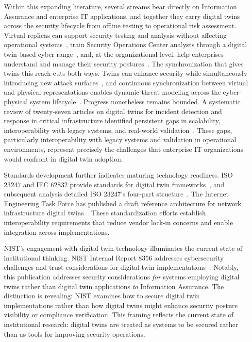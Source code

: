 Within this expanding literature, several streams bear directly on Information Assurance and enterprise IT applications, and together they carry digital twins across the security lifecycle from offline testing to operational risk assessment. Virtual replicas can support security testing and analysis without affecting operational systems~\parencite{Eckhart_Ekelhart_2019}, train Security Operations Center analysts through a digital twin-based cyber range~\parencite{Vielberth_2021}, and, at the organizational level, help enterprises understand and manage their security postures~\parencite{Dietz_Pernul_2020}. The synchronization that gives twins this reach cuts both ways. Twins can enhance security while simultaneously introducing new attack surfaces~\parencite{Karaarslan_Babiker_2021}, and continuous synchronization between virtual and physical representations enables dynamic threat modeling across the cyber-physical system lifecycle~\parencite{Erceylan_2025}. Progress nonetheless remains bounded. A systematic review of twenty-seven articles on digital twins for incident detection and response in critical infrastructure identified persistent gaps in scalability, interoperability with legacy systems, and real-world validation~\parencite{Kampourakis_2025}. These gaps, particularly interoperability with legacy systems and validation in operational environments, represent precisely the challenges that enterprise IT organizations would confront in digital twin adoption.

Standards development further indicates maturing technology readiness. ISO 23247 and IEC 62832 provide standards for digital twin frameworks~\parencite{Shao_2021}, and subsequent analysis detailed ISO 23247's four-part structure~\parencite{Shao_ISO_23247_2023}. The Internet Engineering Task Force has published a draft reference architecture for network infrastructure digital twins~\parencite{IETF_NDT_2024}. These standardization efforts establish interoperability requirements that reduce vendor lock-in concerns and enable integration across implementations.

NIST's engagement with digital twin technology illuminates the current state of institutional thinking. NIST Internal Report 8356 addresses cybersecurity challenges and trust considerations for digital twin implementations~\parencite{NIST_IR_8356_2025}. Notably, this publication addresses security considerations \textit{for} systems employing digital twins rather than digital twin applications \textit{to} Information Assurance. The distinction is revealing: NIST examines how to secure digital twin implementations rather than how digital twins might enhance security posture visibility or compliance verification. This framing reflects the current state of institutional research: digital twins are treated as systems to be secured rather than as tools for improving security operations.

